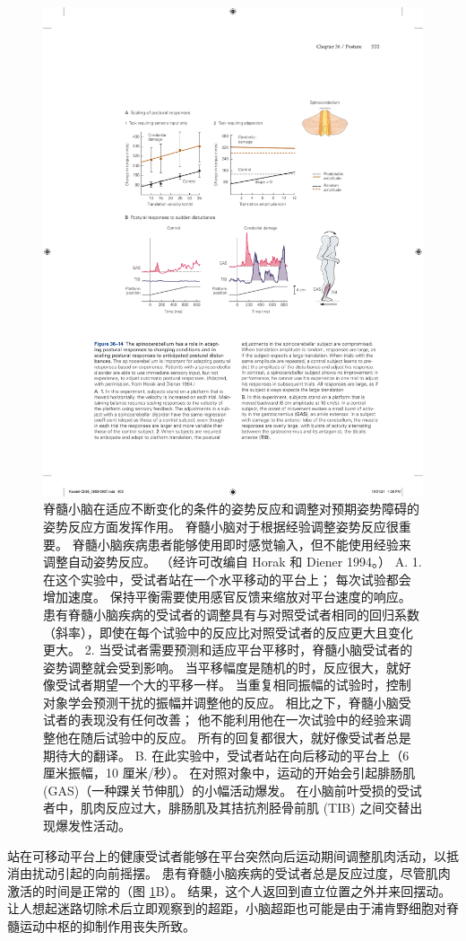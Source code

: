 \begin{figure}[htbp]
	\centering
	\includegraphics[width=0.8\linewidth]{chap36/fig_36_14}
	\caption{脊髓小脑在适应不断变化的条件的姿势反应和调整对预期姿势障碍的姿势反应方面发挥作用。 脊髓小脑对于根据经验调整姿势反应很重要。 脊髓小脑疾病患者能够使用即时感觉输入，但不能使用经验来调整自动姿势反应。 （经许可改编自 Horak 和 Diener 1994。） A. 1. 在这个实验中，受试者站在一个水平移动的平台上； 每次试验都会增加速度。 保持平衡需要使用感官反馈来缩放对平台速度的响应。 患有脊髓小脑疾病的受试者的调整具有与对照受试者相同的回归系数（斜率），即使在每个试验中的反应比对照受试者的反应更大且变化更大。 2. 当受试者需要预测和适应平台平移时，脊髓小脑受试者的姿势调整就会受到影响。 当平移幅度是随机的时，反应很大，就好像受试者期望一个大的平移一样。 当重复相同振幅的试验时，控制对象学会预测干扰的振幅并调整他的反应。 相比之下，脊髓小脑受试者的表现没有任何改善； 他不能利用他在一次试验中的经验来调整他在随后试验中的反应。 所有的回复都很大，就好像受试者总是期待大的翻译。 B. 在此实验中，受试者站在向后移动的平台上（6 厘米振幅，10 厘米/秒）。 在对照对象中，运动的开始会引起腓肠肌 (GAS)（一种踝关节伸肌）的小幅活动爆发。 在小脑前叶受损的受试者中，肌肉反应过大，腓肠肌及其拮抗剂胫骨前肌 (TIB) 之间交替出现爆发性活动。}
	\label{fig:36_14}
\end{figure}


站在可移动平台上的健康受试者能够在平台突然向后运动期间调整肌肉活动，以抵消由扰动引起的向前摇摆。
患有脊髓小脑疾病的受试者总是反应过度，尽管肌肉激活的时间是正常的（图 \ref{fig:36_14}B）。
结果，这个人返回到直立位置之外并来回摆动。
让人想起迷路切除术后立即观察到的超距，小脑超距也可能是由于浦肯野细胞对脊髓运动中枢的抑制作用丧失所致。


